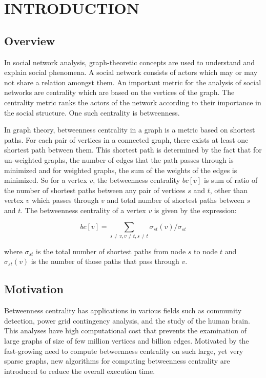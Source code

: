 \chapter{INTRODUCTION}
\label{chap:intro}
\section{Overview}

In social network analysis, graph-theoretic concepts are used to understand and explain social phenomena. A social network consists of actors which may or may not share a relation amongst them. An important metric for the analysis of social networks are centrality which are based on the vertices of the graph. The centrality metric ranks the actors of the network according to their importance in the social structure. One such centrality is betweenness. 

In graph theory, betweenness centrality in a graph is a metric based on shortest paths. For each pair of vertices in a connected graph, there exists at least one shortest path between them. This shortest path is determined by the fact that for un-weighted graphs, the number of edges that the path passes through is minimized and for weighted graphs, the sum of the weights of the edges is minimized. So for a vertex $v$, the betweenness centrality $bc[v]$ is sum of ratio of the number of shortest paths between any pair of vertices $s$ and $t$, other than vertex $v$ which passes through $v$ and total number of shortest paths between $s$ and $t$.
The betweenness centrality of a vertex $v$ is given by the expression:

\[bc[v] = \sum_{s\neq v,v \neq t,s\neq t} \sigma_{st}(v) / \sigma_{st}\]

where $\sigma_{st}$ is the total number of shortest paths from node $s$ to node $t$ and $\sigma_{st}(v)$ is the number of those paths that pass through $v$.

\vspace{-1.0em}
\section{Motivation}
\vspace{-1.0em}
Betweenness centrality has applications in various fields such as community detection, power grid contingency analysis, and the study of the human brain. This analyses have high computational cost that prevents the examination of large graphs of size of few million vertices and billion edges. Motivated by the fast-growing need to compute betweenness centrality on such large, yet very sparse graphs, new algorithms for computing betweenness centrality are introduced to reduce the overall execution time. 

